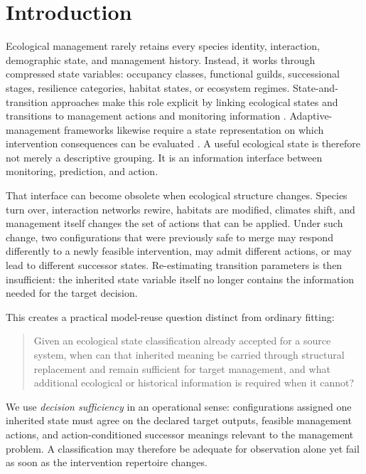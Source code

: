 \documentclass[11pt]{article}
\begin{document}
\section{Introduction}
Ecological management rarely retains every species identity, interaction, demographic state, and management history. Instead, it works through compressed state variables: occupancy classes, functional guilds, successional stages, resilience categories, habitat states, or ecosystem regimes. State-and-transition approaches make this role explicit by linking ecological states and transitions to management actions and monitoring information \citep{BestelmeyerEtAl2017}. Adaptive-management frameworks likewise require a state representation on which intervention consequences can be evaluated \citep{Holling1978,Walters1986}. A useful ecological state is therefore not merely a descriptive grouping. It is an information interface between monitoring, prediction, and action.

That interface can become obsolete when ecological structure changes. Species turn over, interaction networks rewire, habitats are modified, climates shift, and management itself changes the set of actions that can be applied. Under such change, two configurations that were previously safe to merge may respond differently to a newly feasible intervention, may admit different actions, or may lead to different successor states. Re-estimating transition parameters is then insufficient: the inherited state variable itself no longer contains the information needed for the target decision.

This creates a practical model-reuse question distinct from ordinary fitting:
\begin{quote}
Given an ecological state classification already accepted for a source system, when can that inherited meaning be carried through structural replacement and remain sufficient for target management, and what additional ecological or historical information is required when it cannot?
\end{quote}
We use \emph{decision sufficiency} in an operational sense: configurations assigned one inherited state must agree on the declared target outputs, feasible management actions, and action-conditioned successor meanings relevant to the management problem. A classification may therefore be adequate for observation alone yet fail as soon as the intervention repertoire changes.
\end{document}
